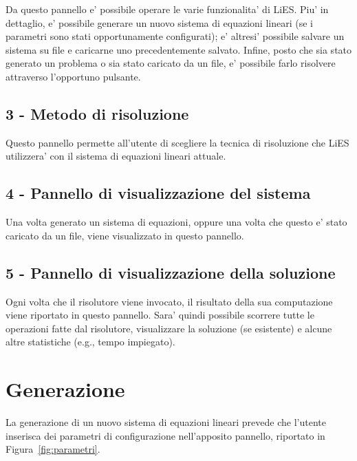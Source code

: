 \documentclass{article}
\begin{document}
Da questo pannello e' possibile operare le varie funzionalita' di LiES. Piu' in dettaglio, e' possibile generare un nuovo sistema di equazioni lineari (se i parametri sono stati opportunamente configurati); e' altresi' possibile salvare un sistema su file e caricarne uno precedentemente salvato. Infine, posto che sia stato generato un problema o sia stato caricato da un file, e' possibile farlo risolvere attraverso l'opportuno pulsante.

\subsection{3 - Metodo di risoluzione}

Questo pannello permette all'utente di scegliere la tecnica di risoluzione che LiES utilizzera' con il sistema di equazioni lineari attuale.

\subsection{4 - Pannello di visualizzazione del sistema}

Una volta generato un sistema di equazioni, oppure una volta che questo e' stato caricato da un file, viene visualizzato in questo pannello.

\subsection{5 - Pannello di visualizzazione della soluzione}

Ogni volta che il risolutore viene invocato, il risultato della sua computazione viene riportato in questo pannello. Sara' quindi possibile scorrere tutte le operazioni fatte dal risolutore, visualizzare la soluzione (se esistente) e alcune altre statistiche (e.g., tempo impiegato).


\section{Generazione}
\label{sec:generazione}

La generazione di un nuovo sistema di equazioni lineari prevede che l'utente inserisca dei parametri di configurazione nell'apposito pannello, riportato in Figura~\ref{fig:parametri}.
\end{document}
